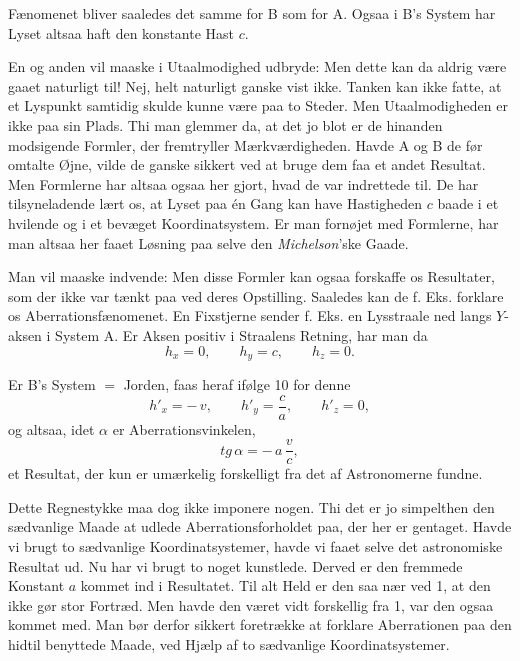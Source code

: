 \documentclass[12pt,a4paper]{article}
\newcommand{\opage}[1]{\marginnote{\footnotesize\textit{[#1]}}}
\begin{document}
Fænomenet bliver saaledes det samme for B som for A. Ogsaa i B's System
\guillemotleft har Lyset altsaa haft\guillemotright{} den konstante Hast $c$.

En og anden vil maaske i Utaalmodighed udbryde: Men dette kan da aldrig være
gaaet naturligt til! Nej, helt naturligt ganske vist ikke. Tanken kan ikke
fatte, at et Lyspunkt samtidig skulde kunne være paa to Steder. Men
Utaalmodigheden er ikke paa sin Plads. Thi man glemmer da, at det jo blot er de
hinanden modsigende Formler, der fremtryller Mærkværdigheden. Havde A og B de
før omtalte Øjne, vilde de ganske sikkert ved at bruge dem faa
\opage{22} et andet Resultat. Men Formlerne har altsaa ogsaa her gjort, hvad de var
indrettede til. De har tilsyneladende lært os, at Lyset paa én Gang kan have
Hastigheden $c$ baade i et hvilende og i et bevæget Koordinatsystem. Er man
fornøjet med Formlerne, har man altsaa her faaet
\guillemotleft Løsning\guillemotright{} paa selve den \emph{Michelson}'ske
Gaade.

Man vil maaske indvende: Men disse Formler kan ogsaa forskaffe os Resultater,
som der ikke var tænkt paa ved deres Opstilling. Saaledes kan de f. Eks.
forklare os Aberrationsfænomenet. En Fixstjerne sender f. Eks. en Lysstraale
ned langs $Y$-aksen i System A. Er Aksen positiv i Straalens Retning, har man
da
\[
  h_{x} = 0, \qquad h_{y} = c, \qquad h_{z} = 0.
\]

Er B's System $=$ Jorden, faas heraf ifølge 10 for denne
\[
  h'_{x} = -\,v, \qquad h'_{y} = \frac{c}{a}, \qquad h'_{z} = 0,
\]
og altsaa, idet $\alpha$ er Aberrationsvinkelen,
\[
  \mathit{tg}\,\alpha = -\,a\,\frac{v}{c},
\]
et Resultat, der kun er umærkelig forskelligt fra det af Astronomerne fundne.

Dette Regnestykke maa dog ikke imponere nogen. Thi det er jo simpelthen den
sædvanlige Maade at udlede Aberrationsforholdet paa, der her er gentaget. Havde
vi brugt to sædvanlige Koordinatsystemer, havde vi faaet selve det astronomiske
Resultat ud. Nu har vi brugt to noget kunstlede. Derved er den fremmede
Konstant $a$ kommet ind i Resultatet. Til alt Held er den saa nær ved 1, at den
ikke gør stor Fortræd. Men havde den været vidt forskellig fra 1, var den ogsaa
kommet med. Man bør derfor sikkert foretrække at forklare Aberrationen paa den
hidtil benyttede Maade, ved Hjælp af to sædvanlige Koordinatsystemer.
\end{document}

